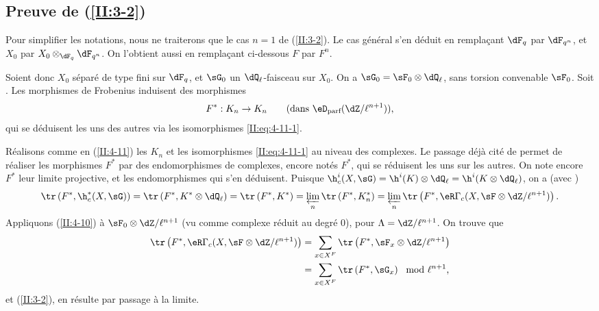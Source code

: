 \subsection{Preuve de \texorpdfstring{(\ref{II:3-2})}{(3.2)}}\label{II:4-13}

Pour simplifier les notations, nous ne traiterons que le cas $n=1$ de 
(\ref{II:3-2}). Le cas général s'en déduit en remplaçant $\dF_q$ par $\dF_{q^n}$, et $X_0$ par $X_0\otimes_{\dF_q}\dF_{q^n}$. On l'obtient aussi en remplaçant ci-dessous 
$F$ par $F^n$. 

Soient donc $X_0$ séparé de type fini sur $\dF_q$, et $\sG_0$ un 
$\dQ_\ell$-faisceau sur $X_0$. On a $\sG_0=\sF_0\otimes\dQ_\ell$,  sans torsion convenable $\sF_0$. Soit 
. Les morphismes de Frobenius induisent 
des morphismes 
\[
  F^* : K_n\to K_n \qquad \text{(dans $\eD_\text{parf}(\dZ/\ell^{n+1})$),}
\]
qui se déduisent les uns des autres via les isomorphismes 
\eqref{II:eq:4-11-1}. 

Réalisons comme en (\ref{II:4-11}) les $K_n$ et les isomorphismes 
\eqref{II:eq:4-11-1} au niveau des complexes. Le passage déjà cité de 
\cite[XV.3.3]{sga5} permet de réaliser les morphismes $F^*$ par des 
endomorphismes de complexes, encore notés $F^*$, qui se réduisent les uns 
sur les autres. On note encore $F^*$ leur limite projective, et les 
endomorphismes qui s'en déduisent. Puisque 
$\h_c^i(X,\sG) = \h^i(K)\otimes\dQ_\ell = \h^i(K\otimes\dQ_\ell)$, on a (avec 
) 
\[
  \tr\left(F^*, \h_c^*(X,\sG)\right) = \tr\left(F^*,K^*\otimes\dQ_\ell\right) = \tr\left(F^*,K^*\right) = \varprojlim_n \tr\left(F^*,K_n^*\right) = \varprojlim_n \tr\left(F^*,\eR\Gamma_c(X,\sF\otimes\dZ/\ell^{n+1})\right) \text{.}
\]
Appliquons (\ref{II:4-10}) à $\sF_0\otimes\dZ/\ell^{n+1}$ (vu comme complexe 
réduit au degré $0$), pour $\Lambda=\dZ/\ell^{n+1}$. On trouve que 
\begin{align*}
  \tr\left(F^*,\eR\Gamma_c(X,\sF\otimes\dZ/\ell^{n+1})\right) 
    &= \sum_{x\in X^F} \tr\left(F^*,\sF_x\otimes\dZ/\ell^{n+1}\right) \\
    &= \sum_{x\in X^F} \tr\left(F^*,\sG_x\right) \mod \ell^{n+1} \text{,}
\end{align*}
et (\ref{II:3-2}), en résulte par passage à la limite. 










